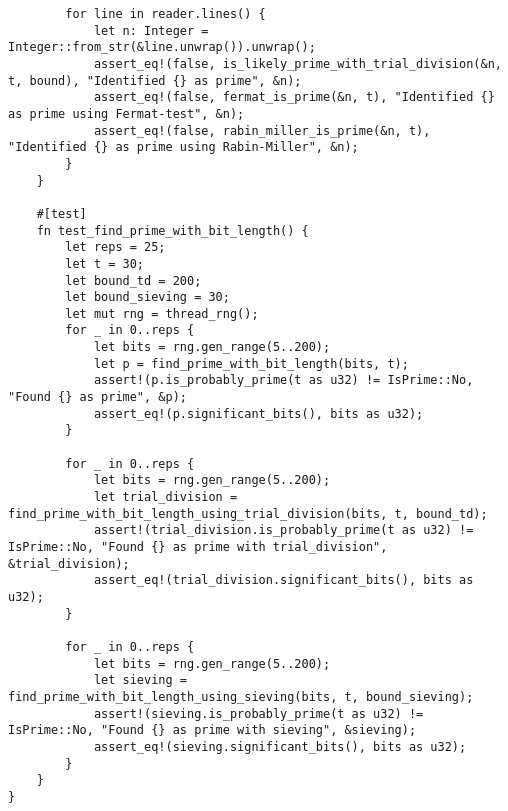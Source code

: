 \begin{verbatim}
        for line in reader.lines() {
            let n: Integer = Integer::from_str(&line.unwrap()).unwrap();
            assert_eq!(false, is_likely_prime_with_trial_division(&n, t, bound), "Identified {} as prime", &n);
            assert_eq!(false, fermat_is_prime(&n, t), "Identified {} as prime using Fermat-test", &n);
            assert_eq!(false, rabin_miller_is_prime(&n, t), "Identified {} as prime using Rabin-Miller", &n);
        }
    }

    #[test]
    fn test_find_prime_with_bit_length() {
        let reps = 25;
        let t = 30;
        let bound_td = 200;
        let bound_sieving = 30;
        let mut rng = thread_rng();
        for _ in 0..reps {
            let bits = rng.gen_range(5..200);
            let p = find_prime_with_bit_length(bits, t);
            assert!(p.is_probably_prime(t as u32) != IsPrime::No, "Found {} as prime", &p);
            assert_eq!(p.significant_bits(), bits as u32);
        }

        for _ in 0..reps {
            let bits = rng.gen_range(5..200);
            let trial_division = find_prime_with_bit_length_using_trial_division(bits, t, bound_td);
            assert!(trial_division.is_probably_prime(t as u32) != IsPrime::No, "Found {} as prime with trial_division", &trial_division);
            assert_eq!(trial_division.significant_bits(), bits as u32);
        }

        for _ in 0..reps {
            let bits = rng.gen_range(5..200);
            let sieving = find_prime_with_bit_length_using_sieving(bits, t, bound_sieving);
            assert!(sieving.is_probably_prime(t as u32) != IsPrime::No, "Found {} as prime with sieving", &sieving);
            assert_eq!(sieving.significant_bits(), bits as u32);
        }
    }
}
\end{verbatim}


